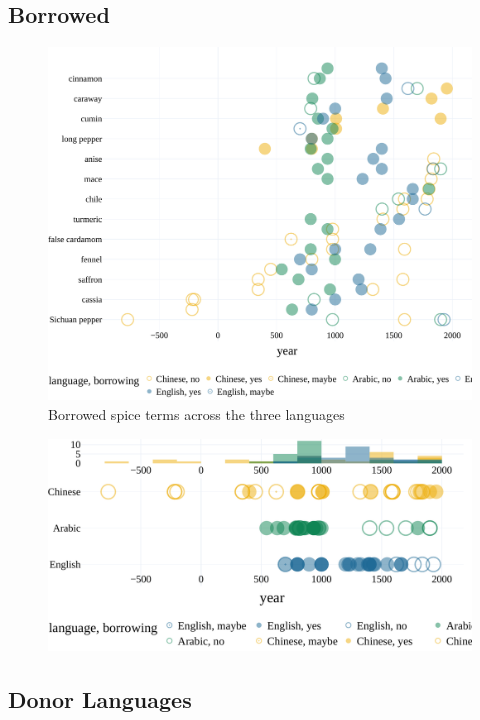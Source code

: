 \subsection{Borrowed}

\begin{figure}[!ht]
  \centering
  \includegraphics[width=\linewidth]{imgs/plots/borrowing.pdf}
  \caption{Borrowed spice terms across the three languages}
  \label{fig:borrowing}
\end{figure}

\begin{figure}[!ht]
  \centering
  \includegraphics[width=\linewidth]{imgs/plots/borrowing_compact.pdf}
  \caption{}
  \label{fig:borrowing_compact}
\end{figure}

\subsection{Donor Languages}

